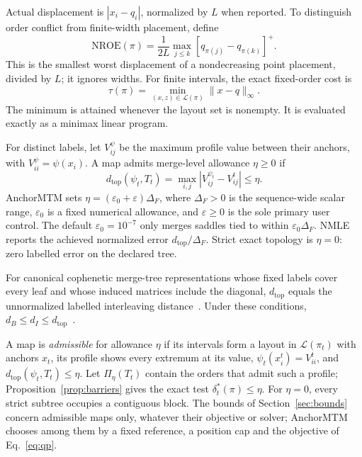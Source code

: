 \documentclass[review]{vgtc}
\newcommand{\dtop}{d_{\mathrm{top}}}
\newcommand{\nroe}{\mathrm{NROE}}
\begin{document}
Actual displacement is $|x_i-q_i|$, normalized by $L$ when reported. To distinguish order conflict from finite-width placement, define
\begin{equation}\label{eq:nroe}
 \nroe(\pi)=\frac{1}{2L}\max_{j\le k}
                      [q_{\pi(j)}-q_{\pi(k)}]^+.
\end{equation}
This is the smallest worst displacement of a nondecreasing point placement, divided by $L$; it ignores widths. For finite intervals, the exact fixed-order cost is
\begin{equation}\label{eq:tau}
 \tau(\pi)=\min_{(x,z)\in\mathcal{L}(\pi)}\|x-q\|_\infty.
\end{equation}
The minimum is attained whenever the layout set is nonempty. It is evaluated exactly as a minimax linear program.

For distinct labels, let $V_{ij}^{\psi}$ be the maximum profile value between their anchors, with $V_{ii}^{\psi}=\psi(x_i)$. A map admits merge-level allowance $\eta\ge0$ if
\begin{equation}\label{eq:dtop}
 \dtop(\psi_t,T_t)=\max_{i,j}|V_{ij}^{\psi_t}-V_{ij}^t|\le\eta.
\end{equation}
AnchorMTM sets $\eta=(\varepsilon_0+\varepsilon)\Delta_F$, where $\Delta_F>0$ is the sequence-wide scalar range, $\varepsilon_0$ is a fixed numerical allowance, and $\varepsilon\ge0$ is the sole primary user control. The default $\varepsilon_0=10^{-7}$ only merges saddles tied to within $\varepsilon_0\Delta_F$. NMLE reports the achieved normalized error $\dtop/\Delta_F$. Strict exact topology is $\eta=0$: zero labelled error on the declared tree.

For canonical cophenetic merge-tree representations whose fixed labels cover every leaf and whose induced matrices include the diagonal, $\dtop$ equals the unnormalized labelled interleaving distance~\cite{Munch:2019:LINF,Gasparovic:2024:IID}. Under these conditions, $d_B\le d_I\le\dtop$~\cite{Morozov:2013:IDMT}.

A map is \emph{admissible} for allowance $\eta$ if its intervals form a layout in $\mathcal{L}(\pi_t)$ with anchors $x_t$, its profile shows every extremum at its value, $\psi_t(x_i^t)=V_{ii}^t$, and $\dtop(\psi_t,T_t)\le\eta$. Let $\Pi_\eta(T_t)$ contain the orders that admit such a profile; Proposition~\ref{prop:barriers} gives the exact test $\delta_t^*(\pi)\le\eta$. For $\eta=0$, every strict subtree occupies a contiguous block. The bounds of Section~\ref{sec:bounds} concern admissible maps only, whatever their objective or solver; AnchorMTM chooses among them by a fixed reference, a position cap and the objective of Eq.~\ref{eq:qp}.
\end{document}
